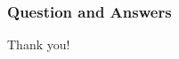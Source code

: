 \documentclass[xcolor=dvipsnames]{beamer}
\theoremstyle{definition}
\begin{document}
\begin{frame}[fragile]
  \frametitle{Question and Answers}

  \begin{center}
    \Huge{Thank you!}
  \end{center}

\end{frame}
\end{document}
